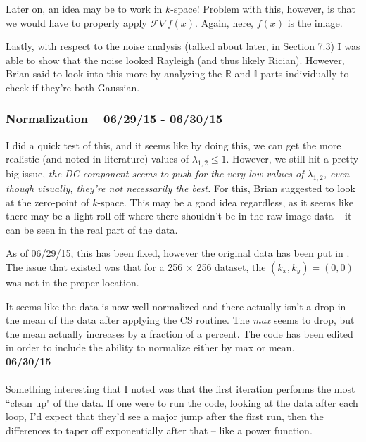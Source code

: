 \documentclass[11 pt]{article}
\newcommand{\bo}{\noindent\textbf}
\begin{document}
    Later on, an idea may be to work in $k$-space! Problem with this, however, is that we would have to properly apply $\mathcal{F}{\nabla f(x)}$. Again, here, $f(x)$ is the image. 

    Lastly, with respect to the noise analysis (talked about later, in Section 7.3) I was able to show that the noise looked Rayleigh (and thus likely Rician). However, Brian said to look into this more by analyzing the $\mathds{R}$ and $\mathds{I}$ parts individually to check if they're both Gaussian. 

  
  \subsubsection{Normalization -- 06/29/15 - 06/30/15}

    I did a quick test of this, and it seems like by doing this, we can get the more realistic (and noted in literature) values of $\lambda_{1,2} \leq 1$. However, we still hit a pretty big issue, \emph{the DC component seems to push for the very low values of $\lambda_{1,2}$, even though visually, they're not necessarily the best.} For this, Brian suggested to look at the zero-point of $k$-space. This may be a good idea regardless, as it seems like there may be a light roll off where there shouldn't be in the raw image data -- it can be seen in the real part of the data. 

    As of 06/29/15, this has been fixed, however the original data has been put in . The issue that existed was that for a 256 $\times$ 256 dataset, the $(k_x,k_y) = (0,0)$ was not in the proper location. 

    It seems like the data is now well normalized and there actually isn't a drop in the mean of the data after applying the CS routine. The \emph{max} seems to drop, but the mean actually increases by a fraction of a percent. The code  has been edited in order to include the ability to normalize either by max or mean. \\

    \bo{06/30/15}\\\\

    Something interesting that I noted was that the first iteration performs the most ``clean up" of the data. If one were to run the code, looking at the data after each loop, I'd expect that they'd see a major jump after the first run, then the differences to taper off exponentially after that -- like a power function. 
\end{document}
